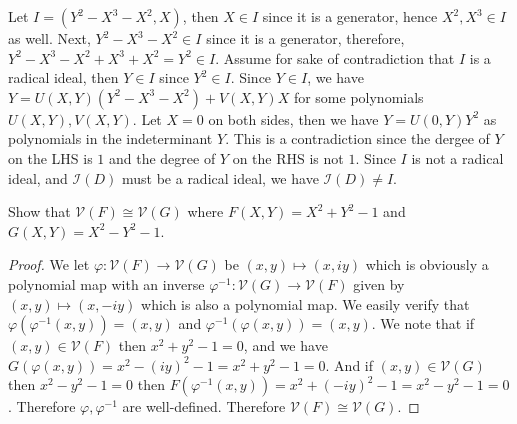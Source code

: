 \documentclass[11pt]{book}
\begin{document}
\begin{problem}
Let $I=(Y^2-X^3-X^2,X)$, then $X\in I$ since it is a generator, hence $X^2,X^3\in I$ as well. Next, $Y^2-X^3-X^2\in I$ since it is a generator, therefore, $Y^2-X^3-X^2+X^3+X^2=Y^2\in I$. Assume for sake of contradiction that $I$ is a radical ideal, then $Y\in I$ since $Y^2\in I$. Since $Y\in I$, we have $Y=U(X,Y)(Y^2-X^3-X^2)+V(X,Y)X$ for some polynomials $U(X,Y),V(X,Y)$. Let $X=0$ on both sides, then we have $Y=U(0,Y)Y^2$ as polynomials in the indeterminant $Y$. This is a contradiction since the dergee of $Y$ on the LHS is $1$ and the degree of $Y$ on the RHS is not $1$. Since $I$ is not a radical ideal, and $\mathcal{I}(D)$ must be a radical ideal, we have $\mathcal{I}(D)\ne I$.
\end{problem}

\begin{problem}
Show that $\mathcal{V}(F)\cong \mathcal{V}(G)$ where $F(X,Y)=X^2+Y^2-1$ and $G(X,Y)=X^2-Y^2-1$.
\begin{proof}
We let $\varphi:\mathcal{V}(F)\rightarrow \mathcal{V}(G)$ be $(x,y)\mapsto (x,iy)$ which is obviously a polynomial map with an inverse $\varphi^{-1}:\mathcal{V}(G)\rightarrow \mathcal{V}(F)$ given by $(x,y)\mapsto (x,-iy)$ which is also a polynomial map. We easily verify that $\varphi(\varphi^{-1}(x,y))=(x,y)$ and $\varphi^{-1}(\varphi(x,y))=(x,y)$. We note that if $(x,y)\in\mathcal{V}(F)$ then $x^2+y^2-1=0$, and we have $G(\varphi(x,y))=x^2-(iy)^2-1=x^2+y^2-1=0$. And if $(x,y)\in\mathcal{V}(G)$ then $x^2-y^2-1=0$ then $F(\varphi^{-1}(x,y))=x^2+(-iy)^2-1=x^2-y^2-1=0$. Therefore $\varphi,\varphi^{-1}$ are well-defined. Therefore $\mathcal{V}(F)\cong \mathcal{V}(G)$.
\end{proof}
\end{problem}
\end{document}
